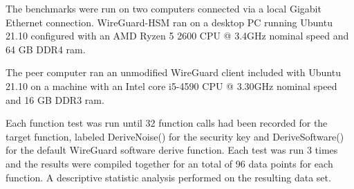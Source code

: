 \documentclass [11pt, proquest] {uwthesis}[2020/02/24]
\begin{document}
The benchmarks were run on two computers connected via a local Gigabit Ethernet connection. 
WireGuard-HSM ran on a desktop PC running Ubuntu 21.10 configured with an AMD Ryzen 5 2600 CPU @ 3.4GHz nominal speed and 64 GB DDR4 ram. 

The peer computer ran an unmodified WireGuard client included with Ubuntu 21.10 on a machine with an Intel core i5-4590 CPU @ 3.30GHz nominal speed and 16 GB DDR3 ram.  

Each function test was run until 32 function calls had been recorded for the target function, labeled DeriveNoise() for the security key and DeriveSoftware() for the default WireGuard software derive function.
Each test was run 3 times and the results were compiled together for an total of 96 data points for each function. A descriptive statistic analysis performed on the resulting data set.
\end{document}
